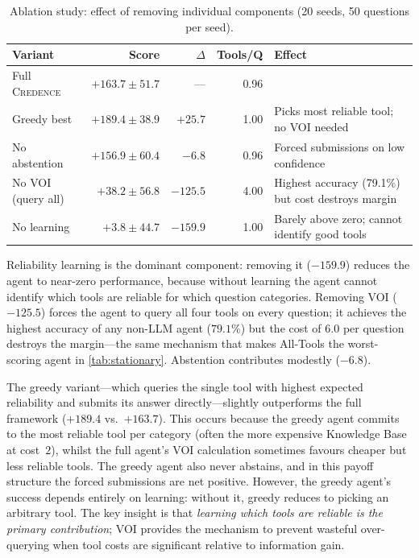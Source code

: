 \documentclass[11pt]{article}
\newcommand{\credence}{\textsc{Credence}}
\begin{document}
\begin{table}[t]
\centering
\caption{Ablation study: effect of removing individual components (20 seeds, 50 questions per seed).}
\label{tab:ablation}
\begin{tabular}{@{}lrrrl@{}}
\toprule
Variant & Score & $\Delta$ & Tools/Q & Effect \\
\midrule
Full \credence{} & $+163.7 \pm 51.7$ & --- & 0.96 \\
Greedy best & $+189.4 \pm 38.9$ & $+25.7$ & 1.00 & Picks most reliable tool; no VOI needed \\
No abstention & $+156.9 \pm 60.4$ & $-6.8$ & 0.96 & Forced submissions on low confidence \\
No VOI (query all) & $+38.2 \pm 56.8$ & $-125.5$ & 4.00 & Highest accuracy (79.1\%) but cost destroys margin \\
No learning & $+3.8 \pm 44.7$ & $-159.9$ & 1.00 & Barely above zero; cannot identify good tools \\
\bottomrule
\end{tabular}
\end{table}

Reliability learning is the dominant component: removing it ($-159.9$) reduces the agent to near-zero performance, because without learning the agent cannot identify which tools are reliable for which question categories. Removing VOI ($-125.5$) forces the agent to query all four tools on every question; it achieves the highest accuracy of any non-LLM agent ($79.1\%$) but the cost of $6.0$ per question destroys the margin---the same mechanism that makes All-Tools the worst-scoring agent in \cref{tab:stationary}. Abstention contributes modestly ($-6.8$).

The greedy variant---which queries the single tool with highest expected reliability and submits its answer directly---slightly outperforms the full framework ($+189.4$ vs.\ $+163.7$). This occurs because the greedy agent commits to the most reliable tool per category (often the more expensive Knowledge Base at cost~$2$), whilst the full agent's VOI calculation sometimes favours cheaper but less reliable tools. The greedy agent also never abstains, and in this payoff structure the forced submissions are net positive. However, the greedy agent's success depends entirely on learning: without it, greedy reduces to picking an arbitrary tool. The key insight is that \emph{learning which tools are reliable is the primary contribution}; VOI provides the mechanism to prevent wasteful over-querying when tool costs are significant relative to information gain.
\end{document}
